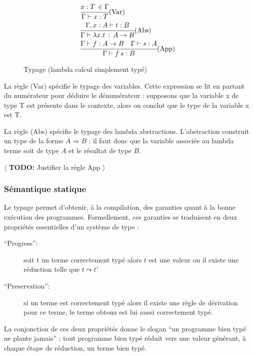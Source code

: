 \documentclass{article}
\newcommand{\TODO}[1]{$\langle$ \textbf{TODO:} #1 $\rangle$}
\theoremstyle{definition}
\theoremstyle{remark}
\begin{document}
\begin{figure}

\begin{align*}
&  \cfrac{x:T\,\in\Gamma}
         {\Gamma\vdash x:T}\mbox{(Var)} 
  \\
&  \cfrac{\Gamma, x:A \vdash t:B}
         {\Gamma \vdash \lambda x. t \,:\, A\rightarrow B}\mbox{(Abs)} \\
&  \cfrac{\Gamma \vdash f : A\rightarrow B \quad
          \Gamma \vdash s : A}
         {\Gamma\vdash f\: s : B}\mbox{(App)}
\end{align*}

\caption{Typage (lambda calcul simplement typé)}
\label{fig:typage-simple}
\end{figure}

La règle (Var) spécifie le typage des variables. Cette expression se
lit en partant du numérateur pour déduire le dénumérateur : supposons
que la variable x de type T est présente dans le contexte, alors on
conclut que le type de la variable x est T.

La règle (Abs) spécifie le typage des lambda
abstractions. L'abstraction construit un type de la forme \(A
\Rightarrow B\) : il faut donc que la variable associée au lambda
terme soit de type \(A\) et le résultat de type \(B\).

\TODO{Justifier la règle App}
               

\subsubsection{Sémantique statique}

Le typage permet d'obtenir, à la compilation, des garanties quant à la
bonne exécution des programmes.  Formellement, ces garanties se traduisent en deux propriétés essentielles d'un système de type :
\begin{description}
\item[``Progress'':] soit \(t\) un terme correctement typé alors \(t\) est une valeur ou il
 existe une réduction telle que \(t \leadsto t'\)
\item[``Preservation'':] si un terme est correctement typé alors il existe une règle
 de dérivation pour ce terme, le terme obtenu est lui aussi correctement
 typé.
\end{description}

La conjonction de ces deux propriétés donne le slogan ``un programme
bien typé ne plante jamais''\citep{milner:no-wrong} : tout programme
bien typé réduit vers une valeur générant, à chaque étape de
réduction, un terme bien typé.
\end{document}
